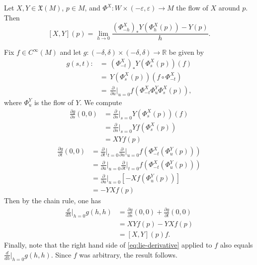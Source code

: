 \documentclass{ximera}
\begin{document}
    \begin{proposition}\label{pro:lie-derivative}
        Let $X,Y \in \mathfrak{X}(M) $, $p \in M$, and $\Phi^X : W \times (- \varepsilon , \varepsilon ) \to M$ the flow of $X$ around $p$. Then 
        \begin{equation}\label{eq:lie-derivative}
               [X,Y] (p)  = \lim_{h \to 0 } \frac{ (\Phi_{-h}^X )_{\ast} Y(\Phi_h^X(p)) - Y(p) }{h}  .
        \end{equation}

    \begin{solution}
        Fix $f \in C^{\infty}(M)$ and let $ g : ( -  \delta  , \delta ) \times (-  \delta  ,  \delta  )  \to \mathbb{R} $ be given by 
        \begin{align*}
            g (s,t)  : &  = \, ( \Phi_{-t} ^X  )_{\ast} Y (\Phi _s ^X (p)) (f)   \\
            &  = \, Y( \Phi _s^X (p)  ) (  f \circ \Phi_{-t} ^X  ) \\
            & = \, \frac{\partial }{ \partial u } \Big \vert _{u = 0} f ( \Phi _{-t}^X \Phi ^Y _u \Phi ^X _s (p)) ,
        \end{align*}
       where $\Phi^Y_u$ is the flow of $Y$.  We compute
        \begin{align*}
            \frac{\partial g}{\partial s} (0,0) & = \frac{\partial }{\partial s} \Big \vert _{s = 0} Y ( \Phi ^X _s (p)   ) (f) \\
            & = \frac{\partial }{\partial s} \Big \vert _{s = 0} Yf (\Phi ^X _s (p )) \\
           & =   X Y f ( p ) 
        \end{align*}
        \begin{align*}
            \frac{\partial g}{\partial t} (0,0)   & = \frac{\partial }{\partial t} \Big \vert _{t = 0}\frac{\partial }{\partial u} \Big \vert _{u = 0}   f (  \Phi ^X _{-t}  ( \Phi ^Y _u (p)  )) \\
           & = \frac{\partial }{\partial u} \Big \vert _{u = 0}\frac{\partial }{\partial t} \Big \vert _{t = 0}   f (  \Phi ^X _{-t}  ( \Phi ^Y _u (p)  )) \\
           & = \frac{\partial }{\partial u} \Big \vert _{u = 0}  [ -  Xf  ( \Phi ^Y _u (p)) ] \\
           & = - YXf (p)
        \end{align*}
        Then by the chain rule, one has
        \begin{align*}
            \frac{d}{dh} \Big \vert _{h= 0} g (h,h) & = \frac{\partial g}{\partial s} (0,0) + \frac{\partial g}{\partial t} (0,0)  \\
            & = X Y f ( p ) -  YXf (p) \\
            & = [X,Y]  (p) f.
        \end{align*}
        Finally, note that the right hand side of \eqref{eq:lie-derivative}  applied to $f$ also equals $\frac{d}{dh} \Big \vert _{h= 0} g (h,h)$.  Since $f$ was arbitrary, the result follows. 
     \end{solution}
    \end{proposition}
    
\end{document}
